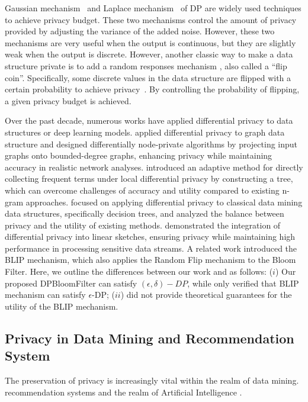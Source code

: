 Gaussian mechanism~\cite{dmns06} and Laplace mechanism~\cite{dr+14} of DP are widely used techniques to achieve privacy budget. 
These two mechanisms control the amount of privacy provided by adjusting the variance of the added noise. However, these two mechanisms are very useful when the output is continuous, but they are slightly weak when the output is discrete.
However, another classic way to make a data structure private is to add a random responses mechanism \cite{w65}, also called a ``flip coin''. Specifically, some discrete values in the data structure are flipped with a certain probability to achieve privacy~\cite{ll23, ll24}. 
By controlling the probability of flipping, a given privacy budget is achieved.

Over the past decade, numerous works have applied differential privacy to data structures or deep learning models. \cite{knrs13} applied differential privacy to graph data structure and designed differentially node-private algorithms by projecting input graphs onto bounded-degree graphs, enhancing privacy while maintaining accuracy in realistic network analyses. \cite{wxy+18} introduced an adaptive method for directly collecting frequent terms under local differential privacy by constructing a tree, which can overcome challenges of accuracy and utility compared to existing n-gram approaches. \cite{fi19} focused on applying differential privacy to classical data mining data structures, specifically decision trees, and analyzed the balance between privacy and the utility of existing methods. \cite{zqr+22} demonstrated the integration of differential privacy into linear sketches, ensuring privacy while maintaining high performance in processing sensitive data streams.
A related work \cite{agk12} introduced the BLIP mechanism, which also applies the Random Flip mechanism to the Bloom Filter. Here, we outline the differences between our work and \cite{agk12} as follows:
($i$) Our proposed DPBloomFilter can satisfy $(\epsilon,\delta)-DP$, while \cite{agk12} only verified that BLIP mechanism can satisfy $\epsilon$-DP; 
($ii$) \cite{agk12} did not provide theoretical guarantees for the utility of the BLIP mechanism.


\subsection{Privacy in Data Mining and Recommendation System} \label{sec:related_work:data_mining_privacy}


The preservation of privacy is increasingly vital within the realm of data mining. recommendation systems\cite{kmt19} and the realm of Artificial Intelligence \cite{gls+25,fjl+24,lss+24_relu,cls+24,lss+24_multi_layer,wxz+24,wcz+23,wsd+24,kll+25,cgl+25,cll+25,cgl+25_homo}.

